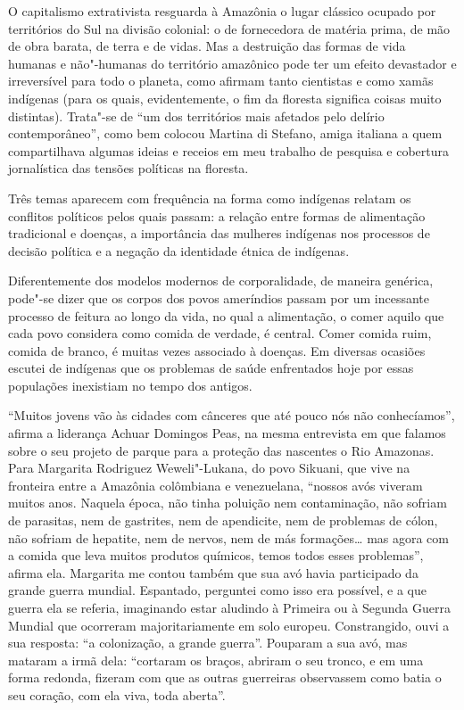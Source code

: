 O capitalismo extrativista resguarda à Amazônia o lugar clássico ocupado
por territórios do Sul na divisão colonial: o de fornecedora de matéria
prima, de mão de obra barata, de terra e de vidas. Mas a destruição das
formas de vida humanas e não"-humanas do território amazônico pode ter um
efeito devastador e irreversível para todo o planeta, como afirmam tanto
cientistas e como xamãs indígenas (para os quais, evidentemente, o fim
da floresta significa coisas muito distintas). Trata"-se de ``um dos
territórios mais afetados pelo delírio contemporâneo'', como bem colocou
Martina di Stefano, amiga italiana a quem compartilhava algumas ideias e
receios em meu trabalho de pesquisa e cobertura jornalística das tensões
políticas na floresta.

\asterisc

Três temas aparecem com frequência na forma como indígenas relatam os
conflitos políticos pelos quais passam: a relação entre formas de
alimentação tradicional e doenças, a importância das mulheres indígenas
nos processos de decisão política e a negação da identidade étnica de
indígenas.

Diferentemente dos modelos modernos de corporalidade, de maneira
genérica, pode"-se dizer que os corpos dos povos ameríndios passam por um
incessante processo de feitura ao longo da vida, no qual a alimentação,
o comer aquilo que cada povo considera como comida de verdade, é
central. Comer comida ruim, comida de branco, é muitas vezes associado à
doenças. Em diversas ocasiões escutei de indígenas que os problemas de
saúde enfrentados hoje por essas populações inexistiam no tempo dos
antigos.

``Muitos jovens vão às cidades com cânceres que até pouco nós não
conhecíamos'', afirma a liderança Achuar Domingos Peas, na mesma
entrevista em que falamos sobre o seu projeto de parque para a proteção
das nascentes o Rio Amazonas. Para Margarita Rodriguez Weweli"-Lukana, do
povo Sikuani, que vive na fronteira entre a Amazônia colômbiana e
venezuelana, ``nossos avós viveram muitos anos. Naquela época, não tinha
poluição nem contaminação, não sofriam de parasitas, nem de gastrites,
nem de apendicite, nem de problemas de cólon, não sofriam de hepatite,
nem de nervos, nem de más formações\ldots{} mas agora com a comida que
leva muitos produtos químicos, temos todos esses problemas'', afirma
ela. Margarita me contou também que sua avó havia participado da grande
guerra mundial. Espantado, perguntei como isso era possível, e a que
guerra ela se referia, imaginando estar aludindo à Primeira ou à Segunda
Guerra Mundial que ocorreram majoritariamente em solo europeu.
Constrangido, ouvi a sua resposta: ``a colonização, a grande guerra''.
Pouparam a sua avó, mas mataram a irmã dela: ``cortaram os braços,
abriram o seu tronco, e em uma forma redonda, fizeram com que as outras
guerreiras observassem como batia o seu coração, com ela viva, toda
aberta''.

